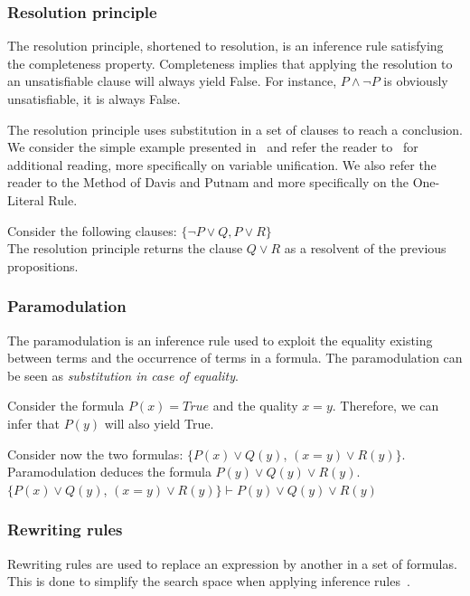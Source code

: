\subsubsection{Resolution principle}
The resolution principle, shortened to resolution, is an inference rule satisfying the completeness property. Completeness implies that applying the resolution to an unsatisfiable clause will always yield False. 
For instance, $P \wedge \neg P$ is obviously unsatisfiable, \ie it is always False.

The resolution principle uses substitution in a set of clauses to reach a conclusion.
We consider the simple example presented in~\cite{snark-Stickel2000} and refer the reader to~\cite{symbolic-proof} for additional reading, more specifically on variable unification.
We also refer the reader to the Method of Davis and Putnam and more specifically on the One-Literal Rule.

Consider the following clauses: $\{\neg P \vee Q,P \vee R\}$ \\
The resolution principle returns the clause $Q \vee R$ as a resolvent of the previous propositions.

\subsubsection{Paramodulation}
The paramodulation is an inference rule used to exploit the equality existing between terms and the occurrence of terms in a formula. The paramodulation can be seen as \textit{substitution in case of equality}.

Consider the formula $P(x) = True$ and the quality $x=y$. Therefore, we can infer that $P(y)$ will also yield True.

Consider now the two formulas: $\{P(x) \vee Q(y)$, $(x = y) \vee R(y)\}$.\\
Paramodulation deduces the formula $P(y) \vee Q(y) \vee R(y)$.\\
$\{P(x) \vee Q(y)$, $(x = y) \vee R(y)\} \vdash P(y) \vee Q(y) \vee R(y)$

\subsubsection{Rewriting rules}
Rewriting rules are used to replace an expression by another in a set of formulas.
This is done to simplify the search space when applying inference rules~\cite{snark-Stickel2000}.

